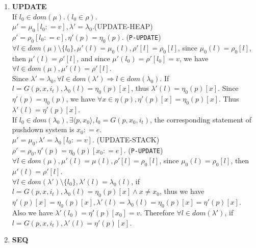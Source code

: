 \documentclass{llncs}
\begin{document}
{\begin{enumerate}[1.]
$\mu'=\mu_0$, $\lambda'=\lambda_0$. (SKIP)\qquad $\rho'=\rho_0$, $\eta'(p)=\eta_0(p)$. (\texttt{P-SKIP})\\
$\forall l\in dom(\mu), \mu_0(l)=\rho_0[l]\Rightarrow \mu'(l)=\rho'[l]$\\
Since $\lambda'=\lambda_0$, $\forall l\in dom(\lambda')\Rightarrow
l\in dom(\lambda_0)$. If $l=G(p,x,i_t)$,
$\lambda_0(l)=\eta_0(p)[x]$, thus $\lambda'(l)=\eta_0(p)[x]$. Since
$\eta'(p)=\eta_0(p)$, we have $\forall x\in \eta(p),
\eta'(p)[x]=\eta_0(p)[x]$. Thus $\lambda'(l)=\eta'(p)[x]$.
\item \textbf{UPDATE}\\
If $l_0\in dom(\mu). (l_0\in \rho)$.\\
$\mu'=\mu_0[l_0\mathrel{\mathop:}= v],
\lambda'=\lambda_0$.(UPDATE-HEAP)\\
$\rho'=\rho_0[l_0\mathrel{\mathop:}= e],\eta'(p)=\eta_0(p)$.
(\texttt{P-UPDATE})\\
$\forall l\in dom(\mu)\setminus\{l_0\}, \mu'(l)=\mu_0(l),
\rho'[l]=\rho_0[l]$, since $\mu_0(l)=\rho_0[l]$, then
$\mu'(l)=\rho'[l]$, and since $\mu'(l_0)=\rho'[l_0]=v$, we have
$\forall l\in dom(\mu), \mu'(l)=\rho'[l]$.\\
Since $\lambda'=\lambda_0, \forall l\in dom(\lambda')\Rightarrow
l\in dom(\lambda_0)$. If $l=G(p,x,i_t), \lambda_0(l)=\eta_0(p)[x]$,
thus $\lambda'(l)=\eta_0(p)[x]$. Since $\eta'(p)=\eta_0(p)$, we have
$\forall x\in \eta(p), \eta'(p)[x]=\eta_0(p)[x]$. Thus
$\lambda'(l)=\eta'(p)[x]$.\\
If $l_0\in dom(\lambda_0), \exists \langle
p,x_0\rangle,l_0=G(p,x_0,i_t)$, the corresponding statement of
pushdown system is $x_0 \mathrel{\mathop:}= e$.\\
$\mu'=\mu_0, \lambda'=\lambda_0[l_0\mathrel{\mathop:}= v]$.
(UPDATE-STACK)\\
$\rho'=\rho_0, \eta'(p)=\eta_0(p)[x_0\mathrel{\mathop:}= e]$.
(\texttt{P-UPDATE})\\
$\forall l\in dom(\mu),\mu'(l)=\mu(l),\rho'[l]=\rho_0[l]$, since
$\mu_0(l)=\rho_0[l]$, then $\mu'(l)=\rho'[l]$.\\
$\forall l\in dom(\lambda')\setminus\{l_0\},
\lambda'(l)=\lambda_0(l)$, if $l=G(p,x,i_t),
\lambda_0(l)=\eta_0(p)[x] \wedge x \neq x_0$, thus we have
$\eta'(p)[x]=\eta_0(p)[x],
\lambda'(l)=\lambda_0(l)=\eta_0(p)[x]=\eta'(p)[x]$. Also we have
$\lambda'(l_0)=\eta'(p)[x_0]=v$. Therefore $\forall l\in
dom(\lambda')$, if $l=G(p,x,i_t),\lambda'(l)=\eta'(p)[x]$.

\item \textbf{SEQ}


\end{enumerate}}
\end{document}
